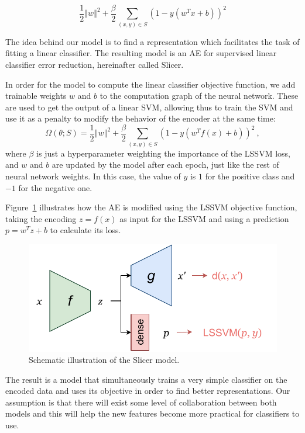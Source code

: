 \documentclass[
	fontsize=11pt, %
	twoside=false, %
	open=any, %
	secnumdepth=1, %
]{kaobook}
\newcommand{\change}[1]{{\color{blue}#1}}
\renewcommand{\change}[1]{#1}
\begin{document}
\begin{equation}\frac 1 2 \left\Vert w\right\Vert^2+\frac \beta 2\sum_{(x,y)\in S}\left(1 - y\left(w^Tx+b\right)\right)^2\end{equation}

The idea behind our model is to find a representation which facilitates the task of fitting a linear classifier. The resulting model is an AE for supervised linear classifier error reduction, hereinafter called Slicer.

In order for the model to compute the linear classifier objective function, we add trainable weights $w$ and $b$ to the computation graph of the neural network. These are used to get the output of a linear SVM, allowing thus to train the SVM and use it as a penalty to modify the behavior of the encoder at the same time:
\begin{equation}\Omega(\theta;S)=\frac 1 2 \left\Vert w\right\Vert^2+\frac \beta 2\sum_{(x,y)\in S}\left(1 - y\left(w^Tf(x)+b\right)\right)^2~,\end{equation}
where $\beta$ is just a hyperparameter weighting the importance of the LSSVM loss, and $w$ and $b$ are updated by the model after each epoch, just like the rest of neural network weights. In this case, the value of $y$ is $1$ for the positive class and $-1$ for the negative one.


Figure~\ref{fig.slicer} illustrates how the AE is modified using the LSSVM objective function, taking the encoding $z=f(x)$ as input for the LSSVM and using a prediction $p=w^Tz+b$ to calculate its loss.

\begin{figure}[ht]
  \centering
  \includegraphics[width=.4\textwidth]{slicer.pdf}
  \caption{\label{fig.slicer}\change{Schematic illustration of the Slicer model. }}
\end{figure}

The result is a model that simultaneously trains a very simple classifier on the encoded data and uses its objective in order to find better representations. Our assumption is that there will exist some level of collaboration between both models and this will help the new features become more practical for classifiers to use.
\end{document}

